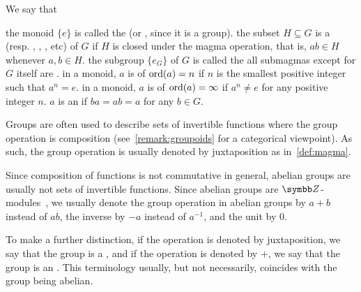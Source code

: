 \begin{definition}
  We say that
  \begin{defenum}
     the monoid \( \{ e \} \) is called the  (or , since it is a group).
     the subset \( H \subseteq G \) is a  (resp. , , , etc) of \( G \) if \( H \) is closed under the magma operation, that is, \( ab \in H \) whenever \( a, b \in H \).
     the subgroup \( \{ e_G \} \) of \( G \) is called the 
     all submagmas except for \( G \) itself are .
     in a monoid, \( a \) is of  \( \operatorname{ord}(a) = n \) if \( n \) is the smallest positive integer such that \( a^n = e \).
     in a monoid, \( a \) is of  \( \operatorname{ord}(a) = \infty \) if \( a^n \neq e \) for any positive integer \( n \).
     \( a \) is an  if \( ba = ab = a \) for any \( b \in G \).
  \end{defenum}
\end{definition}

\begin{remark}\label{remark:additive_group}
  Groups are often used to describe sets of invertible functions where the group operation is composition (see~\cref{remark:groupoids} for a categorical viewpoint). As such, the group operation is usually denoted by juxtaposition as in~\cref{def:magma}.

  Since composition of functions is not commutative in general, abelian groups are usually not sets of invertible functions. Since abelian groups are \( \Z \)-modules~, we usually denote the group operation in abelian groups by \( a + b \) instead of \( ab \), the inverse by \( -a \) instead of \( a^{-1} \), and the unit by \( 0 \).

  To make a further distinction, if the operation is denoted by juxtaposition, we say that the group is a , and if the operation is denoted by \( + \), we say that the group is an . This terminology usually, but not necessarily, coincides with the group being abelian.
\end{remark}

